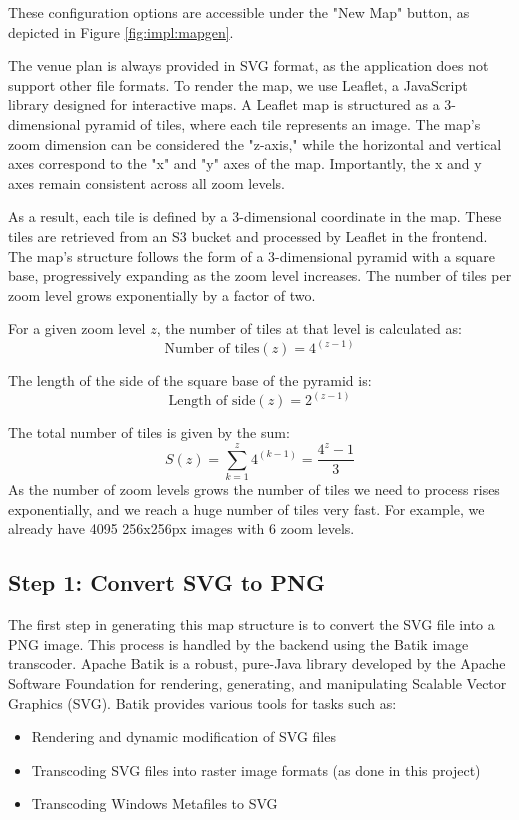 These configuration options are accessible under the "New Map" button, as depicted in Figure \ref{fig:impl:mapgen}.

The venue plan is always provided in SVG format, as the application does not support other file formats. To render the map, we use Leaflet, a JavaScript library designed for interactive maps. A Leaflet map is structured as a 3-dimensional pyramid of tiles, where each tile represents an image. The map's zoom dimension can be considered the "z-axis," while the horizontal and vertical axes correspond to the "x" and "y" axes of the map. Importantly, the x and y axes remain consistent across all zoom levels.

As a result, each tile is defined by a 3-dimensional coordinate in the map. These tiles are retrieved from an S3 bucket and processed by Leaflet in the frontend. The map's structure follows the form of a 3-dimensional pyramid with a square base, progressively expanding as the zoom level increases. The number of tiles per zoom level grows exponentially by a factor of two.

For a given zoom level \( z \), the number of tiles at that level is calculated as:
\[
\text{Number of tiles}(z) = 4^{(z-1)}
\]

The length of the side of the square base of the pyramid is:
\[
\text{Length of side}(z) = 2^{(z-1)}
\]

The total number of tiles is given by the sum:
\[
S(z) = \sum_{k=1}^{z} 4^{(k-1)} = \frac{4^z - 1}{3}
\]
As the number of zoom levels grows the number of tiles we need to process rises exponentially, and we reach a huge number of tiles very fast. For example, we already have 4095 256x256px images with 6 zoom levels.

\subsection{Step 1: Convert SVG to PNG}

The first step in generating this map structure is to convert the SVG file into a PNG image. This process is handled by the backend using the Batik image transcoder. Apache Batik is a robust, pure-Java library developed by the Apache Software Foundation for rendering, generating, and manipulating Scalable Vector Graphics (SVG). Batik provides various tools for tasks such as:

\begin{itemize} \item Rendering and dynamic modification of SVG files \item Transcoding SVG files into raster image formats (as done in this project) \item Transcoding Windows Metafiles to SVG \end{itemize}

